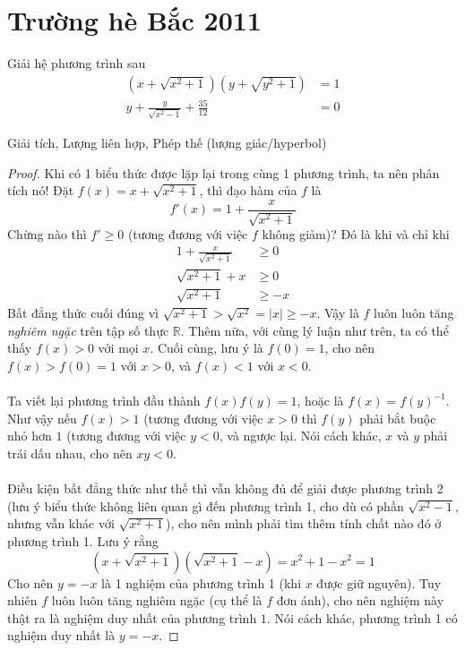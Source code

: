 \documentclass{treatise}
\begin{document}
\section{Trường hè Bắc 2011}
\begin{exercise}
Giải hệ phương trình sau
\begin{align*}
(x + \sqrt{x^2 + 1}) (y + \sqrt{y^2 + 1}) & = 1 \\
y + \frac{y}{\sqrt{x^2 - 1}} + \frac{35}{12} & = 0 
\end{align*}
\end{exercise}
\begin{remark}
Giải tích, Lượng liên hợp, Phép thế (lượng giác/hyperbol)
\end{remark}
\begin{proof}
Khi có 1 biểu thức được lặp lại trong cùng 1 phương trình, ta nên phân tích nó! Đặt $f(x) = x + \sqrt{x^2 + 1}$, thì đạo hàm của $f$ là
$$f'(x) = 1 + \frac{x}{\sqrt{x^2 + 1}}$$
Chừng nào thì $f' \geq 0$ (tương đương với việc $f$ không giảm)? Đó là khi và chỉ khi
\begin{align*}
1 + \frac{x}{\sqrt{x^2 + 1}} & \geq 0 \\
\sqrt{x^2 + 1} + x & \geq 0 \\
\sqrt{x^2 + 1} & \geq -x
\end{align*}
Bất đẳng thức cuối đúng vì $\sqrt{x^2 + 1} > \sqrt{x^2} = |x| \geq -x$. Vậy là $f$ luôn luôn tăng \emph{nghiêm ngặc} trên tập số thực $\mathbb{R}$. Thêm nữa, với cùng lý luận như trên, ta có thể thấy $f(x) > 0$ với mọi $x$. Cuối cùng, lưu ý là $f(0) = 1$, cho nên $f(x) > f(0) = 1$ với $x > 0$, và $f(x) < 1$ với $x < 0$.
\\
\\
Ta viết lại phương trình đầu thành $f(x) f(y) = 1$, hoặc là $f(x) = f(y)^{-1}$. Như vậy nếu $f(x) > 1$ (tương đương với việc $x > 0$ thì $f(y)$ phải bắt buộc nhỏ hơn $1$ (tương đương với việc $y < 0$, và ngược lại. Nói cách khác, $x$ và $y$ phải trái dấu nhau, cho nên $xy < 0$.
\\
\\
Điều kiện bất đẳng thức như thế thì vẫn không đủ để giải được phương trình 2 (lưu ý biểu thức không liên quan gì đến phương trình 1, cho dù có phần $\sqrt{x^2 - 1}$, nhưng vẫn khác với $\sqrt{x^2 + 1}$), cho nên mình phải tìm thêm tính chất nào đó ở phương trình 1. Lưu ý rằng
$$(x + \sqrt{x^2 + 1})(\sqrt{x^2 + 1} - x) = x^2 + 1 - x^2 = 1$$
Cho nên $y = -x$ là 1 nghiệm của phương trình 1 (khi $x$ được giữ nguyên). Tuy nhiên $f$ luôn luôn tăng nghiêm ngặc (cụ thể là $f$ đơn ánh), cho nên nghiệm này thật ra là nghiệm duy nhất của phương trình $1$. Nói cách khác, phương trình 1 có nghiệm duy nhất là $y = -x$.

\end{proof}
\end{document}
